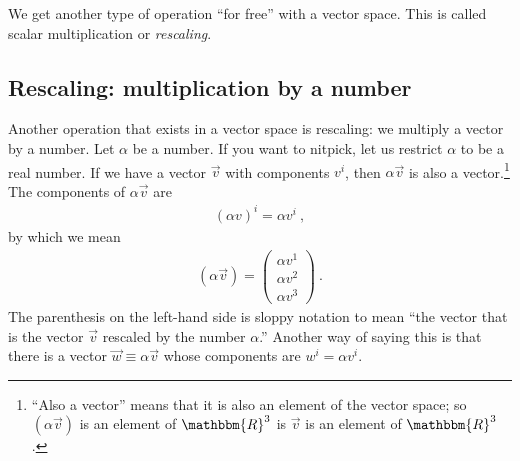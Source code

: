 \documentclass[12pt]{article}
\begin{document}
We get another type of operation ``for free'' with a vector space. This is called scalar multiplication or \emph{rescaling}.










\subsection{Rescaling: multiplication by a number}

Another operation that exists in a vector space is rescaling: we multiply a vector by a number. 
Let $\alpha$ be a number. If you want to nitpick, let us restrict $\alpha$ to be a real number. If we have a vector $\vec{v}$ with components $v^i$, then $\alpha \vec{v}$ is also a vector.\footnote{``Also a vector'' means that it is also an element of the vector space; so $(\alpha\vec{v})$ is an element of $\mathbbm{R}^3$ is $\vec{v}$ is an element of $\mathbbm{R}^3$. } The components of $\alpha \vec{v}$ are
\begin{align}
    (\alpha v)^i = \alpha v^i \ ,
\end{align}
by which we mean
\begin{align}
    (\alpha\vec{v})
    =
    \begin{pmatrix}
        \alpha v^1 \\
        \alpha v^2 \\
        \alpha v^3 
    \end{pmatrix} \ .
\end{align}
The parenthesis on the left-hand side is sloppy notation to mean ``the vector that is the vector $\vec{v}$ rescaled by the number  $\alpha$.'' Another way of saying this is that there is a vector $\vec{w}\equiv \alpha\vec{v}$ whose components are $w^i = \alpha v^i$.
\end{document}
